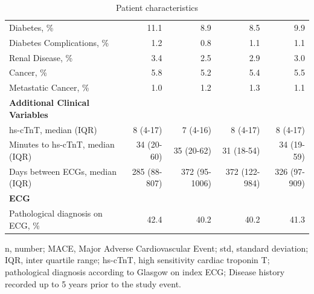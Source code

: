 \documentclass[preprint]{elsarticle}
\begin{document}
\begin{table}
\begin{footnotesize}
\begin{tabular}{@{}lrrrr@{}}
Diabetes, \%                                     & 11.1           & 8.9                 & 8.5           & 9.9            \\
Diabetes Complications, \%                       & 1.2            & 0.8                 & 1.1           & 1.1            \\
Renal Disease, \%                                & 3.4            & 2.5                 & 2.9           & 3.0            \\
Cancer, \%                                       & 5.8            & 5.2                 & 5.4           & 5.5            \\
Metastatic Cancer, \%                            & 1.0            & 1.2                 & 1.3           & 1.1            \\
\midrule
\textbf{Additional Clinical Variables} & & & & \\
\midrule
hs-cTnT, median (IQR)                            & 8 (4-17)       & 7 (4-16)            & 8 (4-17)      & 8 (4-17)       \\
Minutes to hs-cTnT, median (IQR) & 34 (20-60)     & 35 (20-62)          & 31 (18-54)    & 34 (19-59)     \\
Days between ECGs, median (IQR)                  & 285 (88-807)   & 372 (95-1006)       & 372 (122-984) & 326 (97-909)   \\
\midrule
\textbf{ECG} & & & & \\
\midrule
Pathological diagnosis on ECG, \%                & 42.4           & 40.2                & 40.2          & 41.3           \\
\bottomrule
\end{tabular}
\caption{Patient characteristics}
\medskip
\small
n, number; MACE, Major Adverse Cardiovascular Event; std, standard deviation; IQR, inter quartile range; hs-cTnT, high sensitivity cardiac troponin T; pathological diagnosis according to Glasgow on index ECG; Disease history recorded up to 5 years prior to the study event.
\label{table:characteristics}
  \end{footnotesize}
\end{table}
\renewcommand{\arraystretch}{1}
\end{document}
